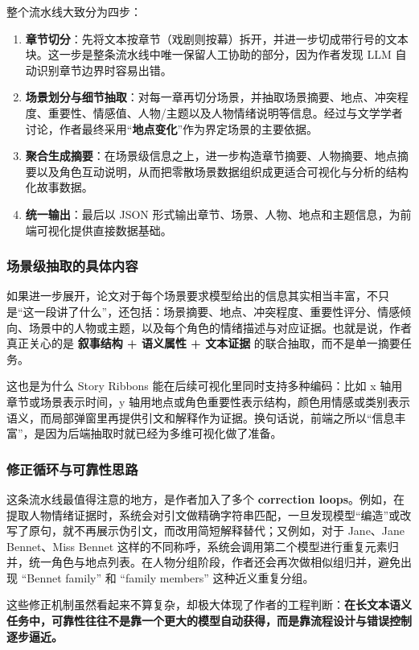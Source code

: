 \documentclass[a4paper,12pt,UTF8]{article}
\begin{document}
整个流水线大致分为四步：

\begin{enumerate}
    \item \textbf{章节切分}：先将文本按章节（戏剧则按幕）拆开，并进一步切成带行号的文本块。这一步是整条流水线中唯一保留人工协助的部分，因为作者发现 LLM 自动识别章节边界时容易出错。
    \item \textbf{场景划分与细节抽取}：对每一章再切分场景，并抽取场景摘要、地点、冲突程度、重要性、情感值、人物/主题以及人物情绪说明等信息。经过与文学学者讨论，作者最终采用“\textbf{地点变化}”作为界定场景的主要依据。
    \item \textbf{聚合生成摘要}：在场景级信息之上，进一步构造章节摘要、人物摘要、地点摘要以及角色互动说明，从而把零散场景数据组织成更适合可视化与分析的结构化故事数据。
    \item \textbf{统一输出}：最后以 JSON 形式输出章节、场景、人物、地点和主题信息，为前端可视化提供直接数据基础。
\end{enumerate}

\subsubsection{场景级抽取的具体内容}
如果进一步展开，论文对于每个场景要求模型给出的信息其实相当丰富，不只是“这一段讲了什么”，还包括：场景摘要、地点、冲突程度、重要性评分、情感倾向、场景中的人物或主题，以及每个角色的情绪描述与对应证据。也就是说，作者真正关心的是 \textbf{叙事结构 + 语义属性 + 文本证据} 的联合抽取，而不是单一摘要任务。

这也是为什么 Story Ribbons 能在后续可视化里同时支持多种编码：比如 x 轴用章节或场景表示时间，y 轴用地点或角色重要性表示结构，颜色用情感或类别表示语义，而局部弹窗里再提供引文和解释作为证据。换句话说，前端之所以“信息丰富”，是因为后端抽取时就已经为多维可视化做了准备。

\subsubsection{修正循环与可靠性思路}
这条流水线最值得注意的地方，是作者加入了多个 \textbf{correction loops}。例如，在提取人物情绪证据时，系统会对引文做精确字符串匹配，一旦发现模型“编造”或改写了原句，就不再展示伪引文，而改用简短解释替代；又例如，对于 Jane、Jane Bennet、Miss Bennet 这样的不同称呼，系统会调用第二个模型进行重复元素归并，统一角色与地点列表。在人物分组阶段，作者还会再次做相似组归并，避免出现 “Bennet family” 和 “family members” 这种近义重复分组。

这些修正机制虽然看起来不算复杂，却极大体现了作者的工程判断：\textbf{在长文本语义任务中，可靠性往往不是靠一个更大的模型自动获得，而是靠流程设计与错误控制逐步逼近。}
\end{document}
